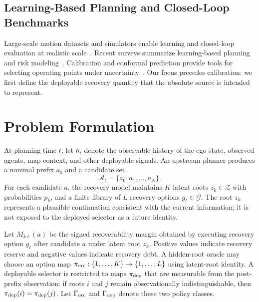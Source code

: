 \documentclass{article} %
\newcommand{\cA}{\mathcal{A}}
\newcommand{\cG}{\mathcal{G}}
\newcommand{\cZ}{\mathcal{Z}}
\begin{document}
\subsection{Learning-Based Planning and Closed-Loop Benchmarks}
Large-scale motion datasets and simulators enable learning and closed-loop evaluation at realistic scale~\citep{ettinger2021large,gulino2023waymax,dosovitskiy2017carla,caesar2021nuplan,li2022metadrive,wilson2023argoverse,zhan2019interaction,althoff2017commonroad,krajewski2018highd,caesar2020nuscenes}. Recent surveys summarize learning-based planning and risk modeling~\citep{ding2025understanding,lu2025risk,hu2025survey}. Calibration and conformal prediction provide tools for selecting operating points under uncertainty~\citep{vovk2005algorithmic,angelopoulos2024conformal,lekeufack2024conformal,strawn2023conformal}. Our focus precedes calibration: we first define the deployable recovery quantity that the absolute source is intended to represent.

\section{Problem Formulation}
\label{sec:problem}

At planning time $t$, let $h_t$ denote the observable history of the ego state, observed agents, map context, and other deployable signals. An upstream planner produces a nominal prefix $a_0$ and a candidate set
\begin{equation}
    \cA_t=\{a_0,a_1,\ldots,a_N\}.
\end{equation}
For each candidate $a$, the recovery model maintains $K$ latent roots $z_k\in\cZ$ with probabilities $p_k$, and a finite library of $L$ recovery options $g_\ell\in\cG$. The root $z_k$ represents a plausible continuation consistent with the current information; it is not exposed to the deployed selector as a future identity.

Let $M_{k\ell}(a)$ be the signed recoverability margin obtained by executing recovery option $g_\ell$ after candidate $a$ under latent root $z_k$. Positive values indicate recovery reserve and negative values indicate recovery debt. A hidden-root oracle may choose an option map $\pi_{\rm orc}:\{1,\ldots,K\}\rightarrow\{1,\ldots,L\}$ using latent-root identity. A deployable selector is restricted to maps $\pi_{\rm dep}$ that are measurable from the post-prefix observation: if roots $i$ and $j$ remain observationally indistinguishable, then $\pi_{\rm dep}(i)=\pi_{\rm dep}(j)$. Let $\Gamma_{\rm orc}$ and $\Gamma_{\rm dep}$ denote these two policy classes.
\end{document}
